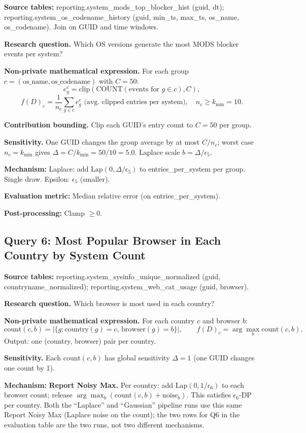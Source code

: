 \documentclass[12pt,letterpaper]{article}
\begin{document}
\textbf{Source tables:} reporting.system\_mods\_top\_blocker\_hist (guid, dt);
reporting.system\_os\_codename\_history (guid, min\_ts, max\_ts, os\_name, os\_codename).
Join on GUID and time windows.

\textbf{Research question.} Which OS versions generate the most MODS blocker events per system?

\textbf{Non-private mathematical expression.} For each group $c = (\text{os\_name}, \text{os\_codename})$ with $C = 50$:
\[
e_g^c = \text{clip}(\text{COUNT}(\text{events for } g \in c), C),
\]
\[
f(D)_c = \frac{1}{n_c} \sum_{g \in c} e_g^c \text{ (avg.\ clipped entries per system)}, \quad n_c \geq k_{\min} = 10.
\]

\textbf{Contribution bounding.} Clip each GUID's entry count to $C = 50$ per group.

\textbf{Sensitivity.} One GUID changes the group average by at most $C/n_c$; worst case $n_c = k_{\min}$ gives $\Delta = C/k_{\min} = 50/10 = 5.0$. Laplace scale $b = \Delta/\epsilon_5$.

\textbf{Mechanism:} Laplace: add $\text{Lap}(0, \Delta/\epsilon_5)$ to entries\_per\_system per group. Single draw. Epsilon: $\epsilon_5$ (smaller).

\textbf{Evaluation metric:} Median relative error (on entries\_per\_system).

\textbf{Post-processing:} Clamp $\geq 0$.

\subsection{Query 6: Most Popular Browser in Each Country by System Count}
\label{sec:q6}

\textbf{Source tables:} reporting.system\_sysinfo\_unique\_normalized (guid, countryname\_normalized); reporting.system\_web\_cat\_usage (guid, browser).

\textbf{Research question.} Which browser is most used in each country?

\textbf{Non-private mathematical expression.} For each country $c$ and browser $b$:
\[
\text{count}(c,b) = |\{g : \text{country}(g)=c,\, \text{browser}(g)=b\}|, \qquad f(D)_c = \arg\max_b \text{count}(c,b).
\]
Output: one (country, browser) pair per country.

\textbf{Sensitivity.} Each $\text{count}(c,b)$ has global sensitivity $\Delta = 1$ (one GUID changes one count by 1).

\textbf{Mechanism:} \textbf{Report Noisy Max.} Per country: add $\text{Lap}(0, 1/\epsilon_6)$ to each browser count; release $\arg\max_b (\text{count}(c,b) + \text{noise}_b)$. This satisfies $\epsilon_6$-DP per country. Both the ``Laplace'' and ``Gaussian'' pipeline runs use this same Report Noisy Max (Laplace noise on the count); the two rows for Q6 in the evaluation table are the two runs, not two different mechanisms.
\end{document}
